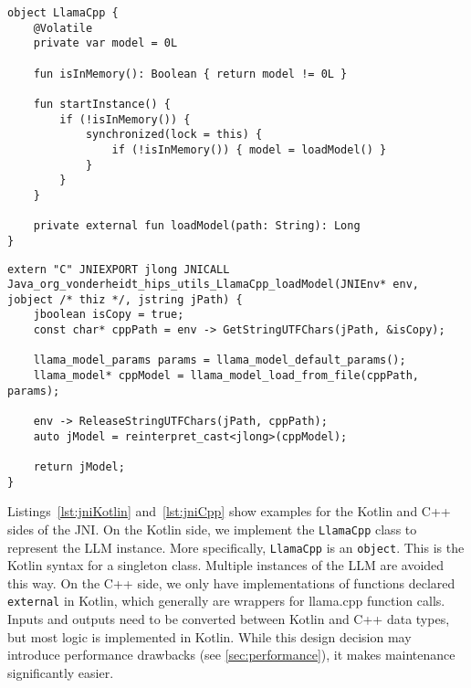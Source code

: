 \begin{lstlisting}[caption={[JNI: Kotlin side]{Example for the Kotlin side of the \gls{JNI}: State management for the \gls{LLM} using a function declared \lstinline|external| at the end.}}, label={lst:jniKotlin}]
object LlamaCpp {
    @Volatile
    private var model = 0L

    fun isInMemory(): Boolean { return model != 0L }

    fun startInstance() {
        if (!isInMemory()) {
            synchronized(lock = this) {
                if (!isInMemory()) { model = loadModel() }
            }
        }
    }

    private external fun loadModel(path: String): Long
}
\end{lstlisting}

\begin{lstlisting}[caption={[JNI: C++ side]{Example for the C++ side of the \gls{JNI}: Implementation of the function declared \lstinline|external| in Listing~\ref{lst:jniKotlin}.}}, label={lst:jniCpp}]
extern "C" JNIEXPORT jlong JNICALL Java_org_vonderheidt_hips_utils_LlamaCpp_loadModel(JNIEnv* env, jobject /* thiz */, jstring jPath) {
    jboolean isCopy = true;
    const char* cppPath = env -> GetStringUTFChars(jPath, &isCopy);

    llama_model_params params = llama_model_default_params();
    llama_model* cppModel = llama_model_load_from_file(cppPath, params);

    env -> ReleaseStringUTFChars(jPath, cppPath);
    auto jModel = reinterpret_cast<jlong>(cppModel);

    return jModel;
}
\end{lstlisting}

Listings~\ref{lst:jniKotlin} and~\ref{lst:jniCpp} show examples for the Kotlin and C++ sides of the \gls{JNI}. On the Kotlin side, we implement the \lstinline|LlamaCpp| class to represent the \gls{LLM} instance. More specifically, \lstinline|LlamaCpp| is an \lstinline|object|. This is the Kotlin syntax for a singleton class. Multiple instances of the \gls{LLM} are avoided this way. On the C++ side, we only have implementations of functions declared \lstinline|external| in Kotlin, which generally are wrappers for llama.cpp function calls. Inputs and outputs need to be converted between Kotlin and C++ data types, but most logic is implemented in Kotlin. While this design decision may introduce performance drawbacks (see \cref{sec:performance}), it makes maintenance significantly easier.

